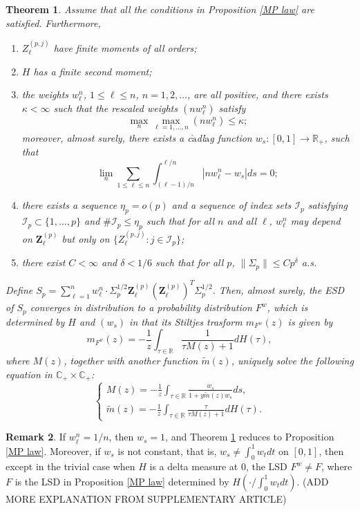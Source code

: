 \documentclass[a4paper,11pt]{article}
\theoremstyle{plain}
\newtheorem{thm}{Theorem}[part]%
\theoremstyle{definition}
\newtheorem{rmrk}[thm]{Remark}
\newcommand{\MR}{\mathbb{R}}
\begin{document}
    \begin{thm} \label{Thm 1}
    	Assume that all the conditions in Proposition \ref{MP law} are satisfied. Furthermore,
    	\begin{enumerate}
    		\item $Z_\ell^{(p, j)}$ have finite moments of all orders;
    		\item $H$ has a finite second moment;
    		\item the weights $w_\ell^n$, $1 \leq \ell \leq n$, $n = 1, 2, \dots$, are all positive, and there exists $\kappa < \infty$ such that the rescaled weights $(nw_\ell^n)$ satisfy
    		\[ \max_n \max_{\ell = 1, \dots, n} (nw_\ell^n) \leq \kappa; \]
    		moreover, almost surely, there exists a c$\grave{\text{a}}$dl$\grave{\text{a}}$g function $w_s: [0, 1] \rightarrow \MR_{+}$, such that
    		\[ \lim_n \sum_{1 \leq \ell \leq n} \int_{(\ell-1)/n}^{\ell/n} |n w_\ell^n - w_s|ds = 0; \]
    		\item there exists a sequence $\eta_p = o(p)$ and a sequence of index sets $\mathcal{I}_p$ satisfying $\mathcal{I}_p \subset \{1, \dots, p\}$ and $\#\mathcal{I}_p \leq \eta_p$ such that for all $n$ and all $\ell$, $w_\ell^n$ may depend on $\mathbf{Z}_\ell^{(p)}$ but only on $\{ Z_\ell^{(p,j)}: j \in \mathcal{I}_p \}$;
    		\item there exist $C < \infty$ and $\delta < 1/6$ such that for all $p$, $\| \Sigma_p \| \leq Cp^\delta$ a.s.
    	\end{enumerate}
    	Define $S_p = \sum_{\ell=1}^{n} w_\ell^n \cdot \Sigma_p^{1/2} \mathbf{Z}_\ell^{(p)} (\mathbf{Z}_\ell^{(p)})^T\Sigma_p^{1/2} $. Then, almost surely, the ESD of $S_p$ converges in distribution to a probability distribution $F^w$, which is determined by $H$ and $(w_s)$ in that its Stiltjes trasform $m_{F^w}(z)$ is given by
    	\[ m_{F^w}(z) = -\frac{1}{z} \int_{\tau \in \MR} \frac{1}{\tau M(z) + 1} dH(\tau), \]
    	where $M(z)$, together with another function $\tilde{m}(z)$, uniquely solve the following equation in $\mathbb{C}_{+} \times \mathbb{C}_{+}$:
    	\[
    	\left \{
    	\begin{array}{l}
    		M(z) = -\frac{1}{z} \int_{\tau \in \MR} \frac{w_s}{1 + y \tilde{m}(z)w_s} ds,  \\
    		\tilde{m}(z) =  -\frac{1}{z} \int_{\tau \in \MR} \frac{\tau}{\tau M(z) + 1} dH(\tau).
    	\end{array}
    	\right.
    	\]
    \end{thm}
    
    \begin{rmrk}
    	If $w_\ell^n = 1/n$, then $w_s=1$, and Theorem \ref{Thm 1} reduces to Proposition \ref{MP law}. Moreover, if $w_s$ is not constant, that is, $w_s \neq \int_{0}^{1} w_t dt$ on $[0, 1]$, then except in the trivial case when $H$ is a delta measure at $0$, the LSD $F^w \neq F$, where $F$ is the LSD in Proposition \ref{MP law} determined by $H(\cdot / \int_{0}^{1} w_t dt)$. (ADD MORE EXPLANATION FROM SUPPLEMENTARY ARTICLE)
    \end{rmrk}
    
\end{document}
